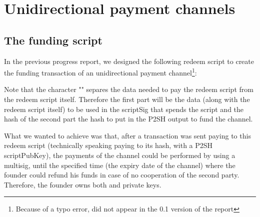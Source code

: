 \chapter*{Unidirectional payment channels}
\label{chap:unidir-pc}
\section{The funding script}
In the previous progress report, we designed the following redeem script to create the funding transaction of an unidirectional payment channel\footnote{Because of a typo error,  did not appear in the 0.1 version of the report}:
\begin{center}
\end{center}
Note that the character "\code{|}" separes the data needed to pay the redeem script from the redeem script itself. Therefore the first part will be the data (along with the redeem script itself) to be used in the scriptSig that spends the script and the hash of the second part the hash to put in the P2SH output to fund the channel.

What we wanted to achieve was that, after a transaction was sent paying to this redeem script (technically speaking paying to its hash, with a P2SH scriptPubKey), the payments of the channel could be performed by using a multisig, until the specified time (the expiry date of the channel) where the founder could refund his funds in case of no cooperation of the second party. Therefore, the founder owns both  and  private keys.

